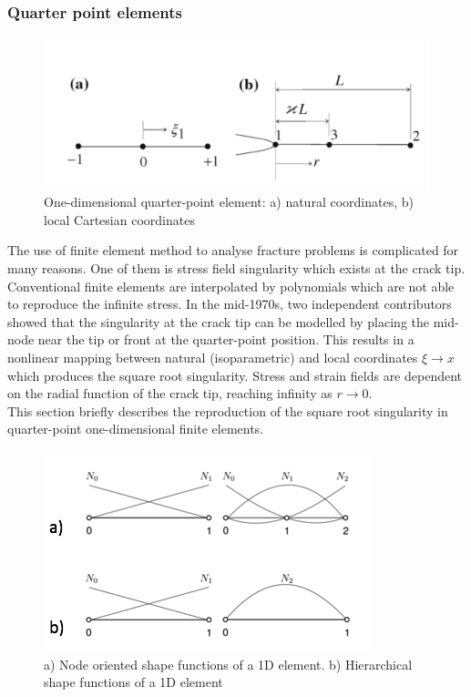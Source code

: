 \documentclass[11pt]{acmeArticle}
\numberwithin{equation}{section}
\begin{document}
\subsubsection{Quarter point elements} %
\begin{figure}
	\centering
	\includegraphics[width=0.7\linewidth]{Figures/1D-quarter.png}
	\caption{One-dimensional quarter-point element: a) natural coordinates, b) local Cartesian coordinates}
	\label{fig:1d-quarter}
\end{figure}
The use of finite element method to analyse fracture problems is complicated for many reasons. One of them is stress field singularity which exists at the crack tip.
Conventional finite elements are interpolated by polynomials which are not able to reproduce the infinite stress. In the mid-1970s, two independent contributors \citep{barsoum1976use,henshell1975crack} showed that the singularity at the crack tip can be modelled by placing the mid-node near the tip or front at the quarter-point position. This results in a nonlinear mapping between natural (isoparametric) and local coordinates $\xi \rightarrow x$ which produces the square root singularity. Stress and strain fields are dependent on the radial function of the crack tip, reaching infinity as $ r \rightarrow 0$. \\
This section briefly describes the reproduction of the square root singularity in quarter-point one-dimensional finite elements. 
\begin{figure}
	\centering
	\includegraphics[width=0.5\linewidth]{Figures/shape_funcs.png}
	\caption{a) Node oriented shape functions of a 1D element. b) Hierarchical shape functions of a 1D element}
	\label{fig:shape_funcs}
\end{figure}
\end{document}
